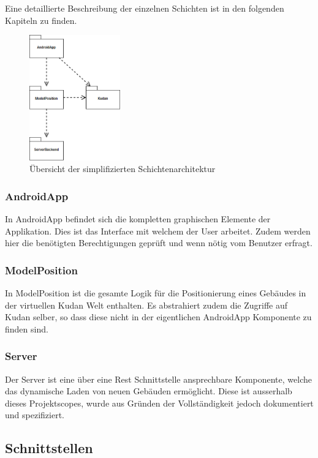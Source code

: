 \documentclass[a4paper]{scrreprt}
\begin{document}
Eine detaillierte Beschreibung der einzelnen Schichten ist in den folgenden Kapiteln zu finden.

\begin{figure}[h!]
  \center
  \includegraphics[width=0.35\textwidth]{SchichtenDiagramm.png}
  \caption{Übersicht der simplifizierten Schichtenarchitektur}
\end{figure}

\subsubsection{AndroidApp}
In AndroidApp befindet sich die kompletten graphischen Elemente der Applikation. Dies ist das Interface mit welchem der User arbeitet. Zudem werden hier die benötigten Berechtigungen geprüft und wenn nötig vom Benutzer erfragt.

\subsubsection{ModelPosition}
In ModelPosition ist die gesamte Logik für die Positionierung eines Gebäudes in der virtuellen Kudan Welt enthalten. Es abstrahiert zudem die Zugriffe auf Kudan selber, so dass diese nicht in der eigentlichen AndroidApp Komponente zu finden sind.

\subsubsection{Server}
Der Server ist eine über eine Rest Schnittstelle ansprechbare Komponente, welche das dynamische Laden von neuen Gebäuden ermöglicht. Diese ist ausserhalb dieses Projektscopes, wurde aus Gründen der Vollständigkeit jedoch dokumentiert und spezifiziert.

\subsection{Schnittstellen}
\end{document}
